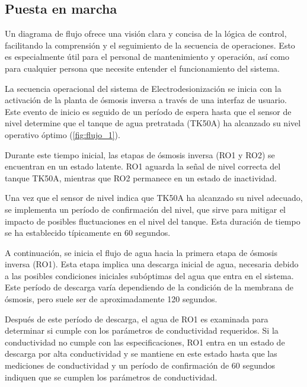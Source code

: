 \subsection{Puesta en marcha}

Un diagrama de flujo ofrece una visión clara y concisa de la lógica de control,
facilitando la comprensión y el seguimiento de la secuencia de operaciones.
Esto es especialmente útil para el personal de mantenimiento y operación,
así como para cualquier persona que necesite entender el funcionamiento del sistema.

La secuencia operacional del sistema de Electrodesionización se inicia con la activación de la planta de
ósmosis inversa a través de una interfaz de usuario. Este evento de inicio es seguido de un
período de espera hasta que el sensor de nivel determine que el tanque de agua pretratada (TK50A)
ha alcanzado su nivel operativo óptimo (\ref{fig:flujo_1}).

Durante este tiempo inicial, las etapas de ósmosis inversa (RO1 y RO2) se encuentran en un estado
latente. RO1 aguarda la señal de nivel correcta del tanque TK50A, mientras que RO2 permanece en un
estado de inactividad.

Una vez que el sensor de nivel indica que TK50A ha alcanzado su nivel adecuado, se implementa
un período de confirmación del nivel, que sirve para mitigar el impacto de posibles fluctuaciones
en el nivel del tanque. Esta duración de tiempo se ha establecido típicamente en 60 segundos.

A continuación, se inicia el flujo de agua hacia la primera etapa de ósmosis inversa (RO1). Esta
etapa implica una descarga inicial de agua, necesaria debido a las posibles condiciones iniciales
subóptimas del agua que entra en el sistema. Este período de descarga varía dependiendo de la condición
de la membrana de ósmosis, pero suele ser de aproximadamente 120 segundos.

Después de este período de descarga, el agua de RO1 es examinada para determinar si cumple con los
parámetros de conductividad requeridos. Si la conductividad no cumple con las especificaciones, RO1
entra en un estado de descarga por alta conductividad y se mantiene en este estado hasta que las
mediciones de conductividad y un período de confirmación de 60 segundos indiquen que se cumplen
los parámetros de conductividad.



